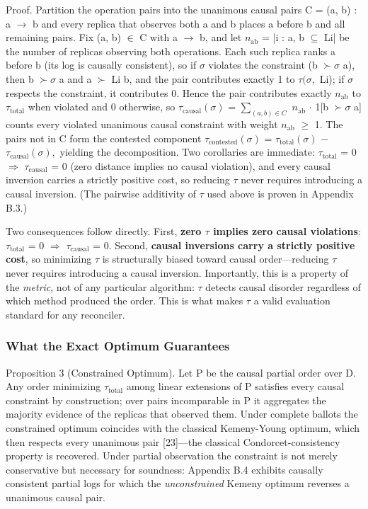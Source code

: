 \documentclass[journal]{IEEEtran}
\begin{document}
Proof. Partition the operation pairs into the unanimous causal pairs C = {(a, b) : a $\rightarrow$ b and every replica that observes both a and b places a before b} and all remaining pairs. Fix (a, b) $\in$ C with a $\rightarrow$ b, and let $n_{\mathrm{ab}}$ = |{i : {a, b} $\subseteq$ Li}| be the number of replicas observing both operations. Each such replica ranks a before b (its log is causally consistent), so if $\sigma$ violates the constraint (b $\succ\sigma$ a), then b $\succ\sigma$ a and a $\succ$ Li b, and the pair contributes exactly 1 to $\tau(\sigma,$ Li); if $\sigma$ respects the constraint, it contributes 0. Hence the pair contributes exactly $n_{\mathrm{ab}}$ to $\tau_{\mathrm{total}}$ when violated and 0 otherwise, so $\tau_{\mathrm{causal}}(\sigma)$ = $\sum_{(a,b)\in C}$ $n_{\mathrm{ab}}$ $\cdot$ 1[b $\succ\sigma$ a] counts every violated unanimous causal constraint with weight $n_{\mathrm{ab}}$ $\geq$ 1. The pairs not in C form the contested component $\tau_{\mathrm{contested}}(\sigma)$ = $\tau_{\mathrm{total}}(\sigma)$ $-$ $\tau_{\mathrm{causal}}(\sigma),$ yielding the decomposition. Two corollaries are immediate: $\tau_{\mathrm{total}}$ = 0 $\Rightarrow$ $\tau_{\mathrm{causal}}$ = 0 (zero distance implies no causal violation), and every causal inversion carries a strictly positive cost, so reducing $\tau$ never requires introducing a causal inversion. (The pairwise additivity of $\tau$ used above is proven in Appendix B.3.)

Two consequences follow directly. First, \textbf{zero $\tau$ implies zero causal violations}: $\tau_{\mathrm{total}}$ = 0 $\Rightarrow$ $\tau_{\mathrm{causal}}$ = 0. Second, \textbf{causal inversions carry a strictly positive cost}, so minimizing $\tau$ is structurally biased toward causal order—reducing $\tau$ never requires introducing a causal inversion. Importantly, this is a property of the \emph{metric}, not of any particular algorithm: $\tau$ detects causal disorder regardless of which method produced the order. This is what makes $\tau$ a valid evaluation standard for any reconciler.

\subsubsection{What the Exact Optimum Guarantees}
Proposition 3 (Constrained Optimum). Let P be the causal partial order over D. Any order minimizing $\tau_{\mathrm{total}}$ among linear extensions of P satisfies every causal constraint by construction; over pairs incomparable in P it aggregates the majority evidence of the replicas that observed them. Under complete ballots the constrained optimum coincides with the classical Kemeny-Young optimum, which then respects every unanimous pair [23]—the classical Condorcet-consistency property is recovered. Under partial observation the constraint is not merely conservative but necessary for soundness: Appendix B.4 exhibits causally consistent partial logs for which the \emph{unconstrained} Kemeny optimum reverses a unanimous causal pair.
\end{document}
